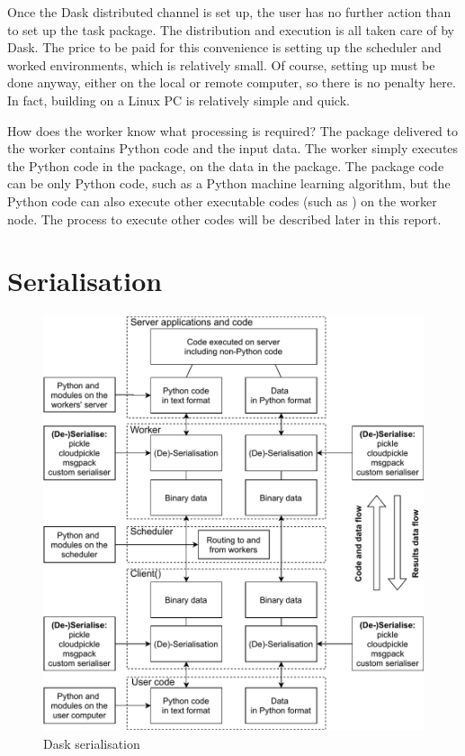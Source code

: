Once the Dask distributed channel is set up, the user has no further action than to set up the task package.  The distribution and execution is all taken care of by Dask.  The price to be paid for this convenience is setting up the scheduler and worked environments, which is relatively small.  Of course, setting up \libradtran{}  must be done anyway, either on the local or remote computer, so there is no penalty here. In fact, building \libradtran{}  on a Linux PC is relatively simple and quick.

How does the worker know what processing is required?
The package delivered to the worker contains Python code and the input data.
The worker simply executes the Python code in the package, on the data in the package.
The package code can be only Python code, such as a Python machine learning algorithm, but the Python code can also execute other executable codes (such as \libradtran{}) on the worker node. The process to execute other codes will be described later in this report.

\section{Serialisation}

\begin{figure}[htbp]
    \centering
\includegraphics[width=\textwidth]{pic/DaskSerialisation}
    \caption{Dask serialisation}
    \label{fig:DaskSerialisation}
\end{figure}

